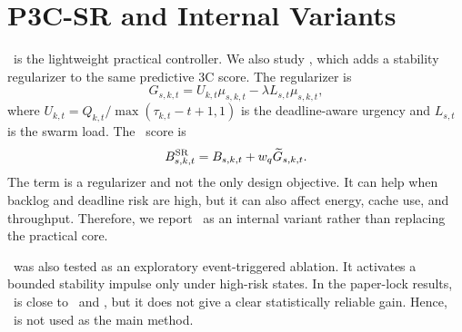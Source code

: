 \section{P3C-SR and Internal Variants}
\pclr\ is the lightweight practical controller. We also study \psr, which adds a stability regularizer to the same predictive 3C score. The regularizer is
\begin{equation}
G_{s,k,t}=U_{k,t}\mu_{s,k,t}-\lambda L_{s,t}\mu_{s,k,t},
\label{eq:stability_gain}
\end{equation}
where $U_{k,t}=Q_{k,t}/\max(\tau_{k,t}-t+1,1)$ is the deadline-aware urgency and $L_{s,t}$ is the swarm load. The \psr\ score is
\begin{equation}
B^{\mathrm{SR}}_{s,k,t}=B_{s,k,t}+w_q\widetilde{G}_{s,k,t}.
\label{eq:p3csr_score}
\end{equation}
The term is a regularizer and not the only design objective. It can help when backlog and deadline risk are high, but it can also affect energy, cache use, and throughput. Therefore, we report \psr\ as an internal variant rather than replacing the practical core.

\etp\ was also tested as an exploratory event-triggered ablation. It activates a bounded stability impulse only under high-risk states. In the paper-lock results, \etp\ is close to \pclr\ and \psr, but it does not give a clear statistically reliable gain. Hence, \etp\ is not used as the main method.



